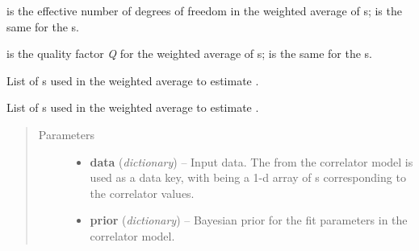 \documentclass[letterpaper,10pt,english]{sphinxmanual}
\begin{document}
\begin{fulllineitems}

\begin{fulllineitems}
\label{corrfitter:fastfit.dof}
 is the effective number of degrees of freedom in the
weighted average of s;  is the same for the
s.

\end{fulllineitems}


\begin{fulllineitems}
\label{corrfitter:fastfit.Q}
 is the quality factor \emph{Q} for the weighted average of
s;  is the same for the s.

\end{fulllineitems}


\begin{fulllineitems}
\label{corrfitter:fastfit.Elist}
List of s used in the weighted average to estimate
.

\end{fulllineitems}


\begin{fulllineitems}
\label{corrfitter:fastfit.ampllist}
List of s used in the weighted average to estimate
.

\end{fulllineitems}

\begin{quote}\begin{description}
\item[{Parameters}] \leavevmode\begin{itemize}
\item {} 
\textbf{data} (\emph{dictionary}) -- Input data. The  from the correlator model is
used as a data key, with  being a 1-d array of
s corresponding to the correlator values.

\item {} 
\textbf{prior} (\emph{dictionary}) -- Bayesian prior for the fit parameters in the 
correlator model.


\end{itemize}
\end{description}
\end{quote}
\end{fulllineitems}
\end{document}
